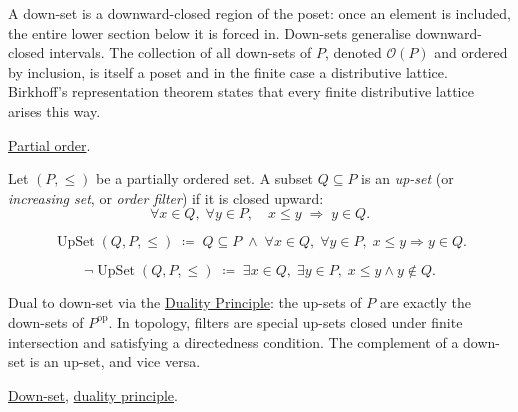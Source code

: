 \begin{remark*}[Interpretation]
A down-set is a downward-closed region of the poset: once an element is
included, the entire lower section below it is forced in.  Down-sets
generalise downward-closed intervals.  The collection of all down-sets of
$P$, denoted $\mathcal{O}(P)$ and ordered by inclusion, is itself a poset
and in the finite case a distributive lattice.  Birkhoff's representation
theorem states that every finite distributive lattice arises this way.
\end{remark*}

\begin{remark*}[Dependencies]
\hyperref[def:partial-order]{Partial order}.
\end{remark*}


\begin{tcolorbox}[colback=defbox, colframe=defborder, arc=2pt,
  left=6pt, right=6pt, top=4pt, bottom=4pt,
  title={\small\textbf{Definition (Up-Set)}},
  fonttitle=\small\bfseries]
\begin{definition}[Up-Set]
\label{def:up-set}
Let $(P, \leq)$ be a partially ordered set.  A subset $Q \subseteq P$ is
an \emph{up-set} (or \emph{increasing set}, or \emph{order filter}) if it
is closed upward:
\[
\forall x \in Q,\; \forall y \in P,\quad x \leq y \;\Longrightarrow\; y \in Q.
\]
\end{definition}
\end{tcolorbox}

\begin{remark*}
\[
\operatorname{UpSet}(Q, P, \leq)
\;\coloneqq\;
Q \subseteq P
\;\land\;
\forall x \in Q,\; \forall y \in P,\;
x \leq y \Rightarrow y \in Q.
\]
\end{remark*}

\begin{remark*}
\[
\neg\operatorname{UpSet}(Q, P, \leq)
\;\coloneqq\;
\exists x \in Q,\; \exists y \in P,\;
x \leq y \land y \notin Q.
\]
\end{remark*}

\begin{remark*}[Interpretation]
Dual to down-set via the
\hyperref[prop:duality-principle]{Duality Principle}: the up-sets of $P$
are exactly the down-sets of $P^{\mathrm{op}}$.  In topology, filters are
special up-sets closed under finite intersection and satisfying a
directedness condition.  The complement of a down-set is an up-set, and
vice versa.
\end{remark*}

\begin{remark*}[Dependencies]
\hyperref[def:down-set]{Down-set},
\hyperref[prop:duality-principle]{duality principle}.
\end{remark*}
